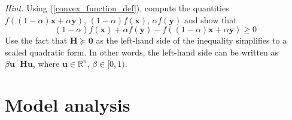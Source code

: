 \documentclass{article}
\numberwithin{equation}{section}
\begin{document}
\begin{enumerate}
    \medskip

    \textit{Hint.} Using (\ref{convex_function_def}), compute the quantities
    $ f((1 - \alpha)\mathbf{x} + \alpha\mathbf{y}) $,
    $ (1 - \alpha)f(\mathbf{x}) $, $ \alpha f(\mathbf{y}) $ and show that
    \begin{equation*}
        (1 - \alpha)f(\mathbf{x}) + \alpha f(\mathbf{y}) -
        f((1 - \alpha)\mathbf{x} + \alpha\mathbf{y}) \ge 0
    \end{equation*}
    Use the fact that $ \mathbf{H} \succeq \mathbf{0} $ as the left-hand side
    of the inequality simplifies to a scaled quadratic form. In other words,
    the left-hand side can be written as $ \beta\mathbf{u}^\top\mathbf{Hu} $,
    where $ \mathbf{u} \in \mathbb{R}^n $, $ \beta \in [0, 1) $.

\end{enumerate}

\section{Model analysis}
\end{document}
